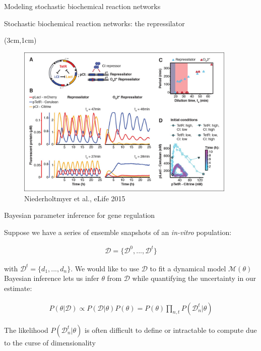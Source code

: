 \documentclass[aspectratio=1610]{beamer}					%
\begin{document}
\begin{section}{Modeling stochastic biochemical reaction networks}

\begin{frame}{Stochastic biochemical reaction networks: the repressilator}
\begin{textblock*}{10.5cm}(3cm,1cm)
\begin{figure}
\includegraphics[width=10.5cm]{repressilator.jpg}
\caption{Niederholtmyer et al., eLife 2015}
\end{figure}
\end{textblock*}
\end{frame}



\begin{frame}{Bayesian parameter inference for gene regulation}

Suppose we have a series of ensemble snapshots of an \emph{in-vitro} population:

\begin{align*}
\mathcal{D} = \{\mathcal{D}^{0}, ..., \mathcal{D}^{t}\}
\end{align*}

with $\mathcal{D}^{t} = \{d_{1}, ..., d_{n}\}$. We would like to use $\mathcal{D}$ to fit a dynamical model $\mathcal{M}(\theta)$\\
\vspace{0.2in}
Bayesian inference lets us infer $\theta$ from $\mathcal{D}$ while quantifying the uncertainty in our estimate:

\begin{align*}
P(\theta|\mathcal{D}) \propto P(\mathcal{D}|\theta)P(\theta) = P(\theta)\prod_{n,t} P(\mathcal{D}_{n}^{t}|\theta)
\end{align*}

The likelihood $P(\mathcal{D}_{n}^{t}|\theta)$ is often difficult to define or intractable to compute due to the curse of dimensionality

\end{frame}

\end{section}
\end{document}
